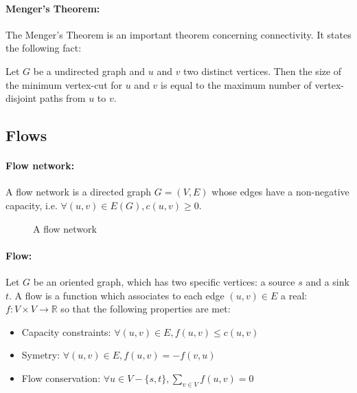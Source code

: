 \paragraph{Menger's Theorem:}
The Menger's Theorem is an important theorem concerning connectivity.
It states the following fact:

Let $G$ be a undirected graph and $u$ and $v$ two distinct vertices.
Then the size of the minimum vertex-cut for $u$ and $v$ is equal to the
maximum number of vertex-disjoint paths from $u$ to $v$.



\subsection{Flows}
\paragraph{Flow network:}
A flow network is a directed graph $G=(V,E)$ whose edges have a non-negative
capacity, i.e. $\forall (u,v) \in E(G), c(u,v) \geq 0$.

\begin{figure}[!h]
  \caption{A flow network}
  \begin{center}
    
  \end{center}
\end{figure}

\paragraph{Flow:}
Let $G$ be an oriented graph, which has two specific vertices: a source $s$ and a
sink $t$.
A flow is a function which associates to each edge $(u,v) \in E$ a real:
$f: V \times V \rightarrow \mathbb{R}$ so that the following properties are met:
\begin{itemize}
    \item Capacity constraints: $\forall (u,v) \in E, f(u,v) \leq c(u,v)$
    \item Symetry: $\forall (u,v) \in E, f(u,v) = - f(v,u) $
    \item Flow conservation: $\forall u \in V - \{s,t\}, \sum_{v \in V}f(u,v) = 0$ 
\end{itemize}


